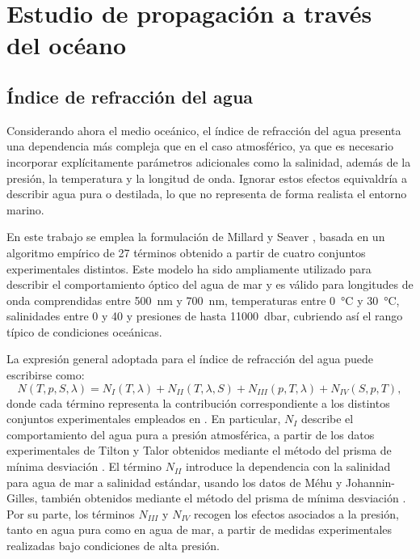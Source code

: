 \section{Estudio de propagación a través del océano}

\subsection{Índice de refracción del agua}

Considerando ahora el medio oceánico, el índice de refracción del agua presenta una dependencia más compleja que en el caso atmosférico, ya que es necesario incorporar explícitamente parámetros adicionales como la salinidad, además de la presión, la temperatura y la longitud de onda. Ignorar estos efectos equivaldría a describir agua pura o destilada, lo que no representa de forma realista el entorno marino.

En este trabajo se emplea la formulación de Millard y Seaver \cite{Millard}, basada en un algoritmo empírico de 27 términos obtenido a partir de cuatro conjuntos experimentales distintos. Este modelo ha sido ampliamente utilizado para describir el comportamiento óptico del agua de mar y es válido para longitudes de onda comprendidas entre \SI{500}{\nano\meter} y \SI{700}{\nano\meter}, temperaturas entre \SI{0}{\celsius} y \SI{30}{\celsius}, salinidades entre \SI{0}{\psu} y \SI{40}{\psu} y presiones de hasta \SI{11000}{\deci\bar}, cubriendo así el rango típico de condiciones oceánicas.

La expresión general adoptada para el índice de refracción del agua puede escribirse como:
\begin{equation}
N(T,p,S,\lambda) = N_I(T,\lambda) + N_{II}(T,\lambda,S) + N_{III}(p,T,\lambda) + N_{IV}(S,p,T),
\label{eq:descomp_N_oceano}
\end{equation}
donde cada término representa la contribución correspondiente a los distintos conjuntos experimentales empleados en \cite{Millard}. En particular, $N_I$ describe el comportamiento del agua pura a presión atmosférica, a partir de los datos experimentales de Tilton y Talor obtenidos mediante el método del prisma de mínima desviación \cite{Tilton}. El término $N_{II}$ introduce la dependencia con la salinidad para agua de mar a salinidad estándar, usando los datos de Méhu y Johannin-Gilles, también obtenidos mediante el método del prisma de mínima desviación \cite{Mehu}. Por su parte, los términos $N_{III}$ y $N_{IV}$ recogen los efectos asociados a la presión, tanto en agua pura como en agua de mar, a partir de medidas experimentales realizadas bajo condiciones de alta presión.


